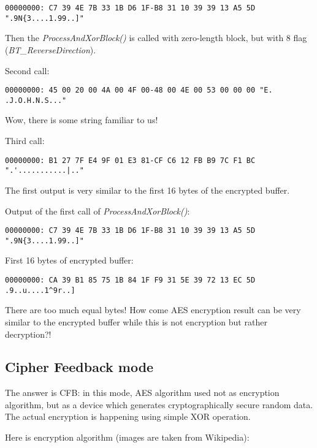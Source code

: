 \begin{lstlisting}
00000000: C7 39 4E 7B 33 1B D6 1F-B8 31 10 39 39 13 A5 5D ".9N{3....1.99..]"
\end{lstlisting}

Then the \emph{ProcessAndXorBlock()} is called with zero-length block, but with 8 flag (\emph{BT\_ReverseDirection}).

Second call:

\begin{lstlisting}
00000000: 45 00 20 00 4A 00 4F 00-48 00 4E 00 53 00 00 00 "E. .J.O.H.N.S..."
\end{lstlisting}

Wow, there is some string familiar to us!

Third call:

\begin{lstlisting}
00000000: B1 27 7F E4 9F 01 E3 81-CF C6 12 FB B9 7C F1 BC ".'...........|.."
\end{lstlisting}

The first output is very similar to the first 16 bytes of the encrypted buffer.

Output of the first call of \emph{ProcessAndXorBlock()}:

\begin{lstlisting}
00000000: C7 39 4E 7B 33 1B D6 1F-B8 31 10 39 39 13 A5 5D ".9N{3....1.99..]"
\end{lstlisting}

First 16 bytes of encrypted buffer:

\begin{lstlisting}
00000000: CA 39 B1 85 75 1B 84 1F F9 31 5E 39 72 13 EC 5D  .9..u....1^9r..]
\end{lstlisting}

There are too much equal bytes!
How come AES encryption result can be very similar to the encrypted buffer while this is not
encryption but rather decryption?!

\subsection{Cipher Feedback mode}

The answer is \ac{CFB}:
in this mode, AES algorithm used not as encryption algorithm, but as a device which generates cryptographically secure random data.
The actual encryption is happening using simple XOR operation.

Here is encryption algorithm (images are taken from Wikipedia):

